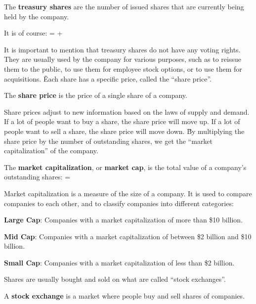The \textbf{treasury shares} are the number of issued shares that are currently being held by the company.
\ed

It is of course:
\bse
{} =  + 
\ese

It is important to mention that treasury shares do not have any voting rights. They are usually used by the company for
various purposes, such as to reissue them to the public, to use them for employee stock options, or to use them for
acquisitions. \v

Each share has a specific price, called the ``share price''.

The \textbf{share price} is the price of a single share of a company.
\ed

Share prices adjust to new information based on the laws of supply and demand. If a lot of people want to buy a share,
the share price will move up. If a lot of people want to sell a share, the share price will move down. \v

By multiplying the share price by the number of outstanding shares, we get the ``market capitalization'' of the
company.

The \textbf{market capitalization}, or \textbf{market cap}, is the total value of a company's outstanding shares:
\bse
{} =  \times {}
\ese
\ed

Market capitalization is a measure of the size of a company. It is used to compare companies to each other, and to
classify companies into different categories:
\bit
\item \textbf{Large Cap}: Companies with a market capitalization of more than \$10 billion.
\item \textbf{Mid Cap}: Companies with a market capitalization of between \$2 billion and \$10 billion.
\item \textbf{Small Cap}: Companies with a market capitalization of less than \$2 billion.
\eit

Shares are usually bought and sold on what are called ``stock exchanges''.

A \textbf{stock exchange} is a market where people buy and sell shares of companies.
\ed

